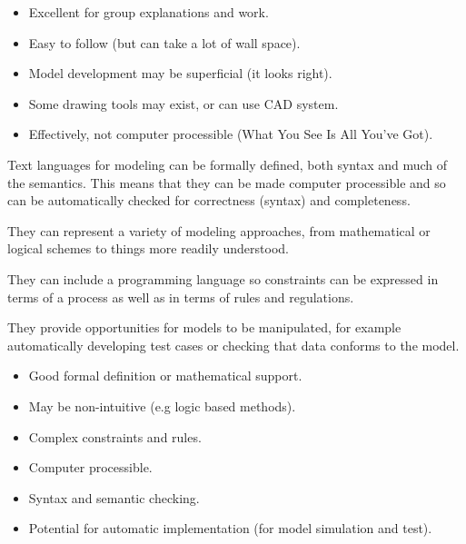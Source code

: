 
\begin{itemize}
\item Excellent for group explanations and work.
\item Easy to follow (but can take a lot of wall space).
\item Model development may be superficial (it looks right).
\item Some drawing tools may exist, or can use CAD system.
\item Effectively, not computer processible (What You See Is All You've Got).
\end{itemize}

\begin{remarks}
\remintro


    Text languages for modeling can be formally defined, both syntax and much
of the semantics. This means that they can be made computer processible and so 
can be automatically checked for correctness (syntax) and completeness.

    They can represent a variety of modeling approaches, from mathematical
or logical schemes to things more readily understood.

    They can include a programming language so constraints can be expressed
in terms of a process as well as in terms of rules and regulations.

   They provide opportunities for models to be manipulated, for example 
automatically developing test cases or checking that data conforms to the
model.   

\remend
\end{remarks}


\begin{itemize}
\item Good formal definition or mathematical support.
\item May be non-intuitive (e.g logic based methods).
\item Complex constraints and rules.
\item Computer processible.
\item Syntax and semantic checking.
\item Potential for automatic implementation (for model simulation and test).
\end{itemize}

